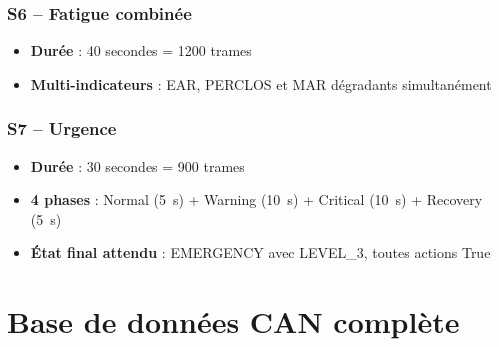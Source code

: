 \documentclass[12pt,a4paper]{report}
\begin{document}
\subsection{S6 -- Fatigue combin\'ee}

\begin{itemize}
  \item \textbf{Dur\'ee} : 40 secondes = 1200 trames
  \item \textbf{Multi-indicateurs} : EAR, PERCLOS et MAR d\'egradants simultan\'ement
\end{itemize}

\subsection{S7 -- Urgence}

\begin{itemize}
  \item \textbf{Dur\'ee} : 30 secondes = 900 trames
  \item \textbf{4 phases} : Normal (5~s) + Warning (10~s) + Critical (10~s) + Recovery (5~s)
  \item \textbf{\'Etat final attendu} : EMERGENCY avec LEVEL\_3, toutes actions True
\end{itemize}

\clearpage

\chapter{Base de donn\'ees CAN compl\`ete}
\end{document}
